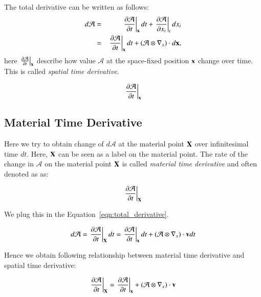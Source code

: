 The total derivative can be written as follows:
%
\begin{eqnarray}
d{\mathcal{A}}
&=&\left.\frac{\partial\mathcal{A}}{\partial{t}}\right|_{\mathbf{x}}dt+\left.\frac{\partial\mathcal{A}}{\partial{x_i}}\right|_{t}dx_i\\
\label{eqn:total_derivative}
&=&\left.\frac{\partial\mathcal{A}}{\partial{t}}\right|_{\mathbf{x}}dt+(\mathcal{A} \otimes \nabla_x) \cdot d{\mathbf{x}},
\end{eqnarray}
%
here $\left.\frac{\partial\mathcal{A}}{\partial{t}}\right|_{\mathbf{x}}$ describe how value $\mathcal{A}$ at the space-fixed position $\mathbf{x}$ change over time. This is called \emph{spatial time derivative}.

\begin{tcolorbox}[title=spatial time derivative]
\begin{equation}
\left.\frac{\partial\mathcal{A}}{\partial{t}}\right|_{\mathbf{x}}
\end{equation}
\end{tcolorbox}



\subsection{Material Time Derivative}


Here we try to obtain change of $d\mathcal{A}$ at the material point $\mathbf{X}$ over infinitesimal time $dt$.
%
Here, $\mathbf{X}$ can be seen as a label on the material point. 
%
The rate of the change in $\mathcal{A}$ on the material point $\mathbf{X}$ is called \emph{material time derivative} and often denoted as as:
%
\begin{tcolorbox}[title=material time derivative]
\begin{equation}
\left.\frac{\partial\mathcal{A}}{\partial{t}}\right|_{\mathbf{X}}
\end{equation}
\end{tcolorbox}
%




%
We plug this in the Equation~\eqref{eqn:total_derivative}.

\begin{equation}
d{\mathcal{A}}=\left.\frac{\partial\mathcal{A}}{\partial{t}}\right|_{\mathbf{X}}dt=\left.\frac{\partial\mathcal{A}}{\partial{t}}\right|_{\mathbf{x}}dt+( \mathcal{A} \otimes \nabla_x ) \cdot {\mathbf{v}}dt
\end{equation}

Hence we obtain following relationship between material time derivative and spatial time derivative:
%
\begin{tcolorbox}[title=relationship between material time derivative and spatial time derivative]
\begin{equation}
\left.\frac{\partial\mathcal{A}}{\partial{t}}\right|_{\mathbf{X}}  =  \left.\frac{\partial\mathcal{A}}{\partial{t}}\right|_{\mathbf{x}}+{( {\mathcal{A}} \otimes \nabla_x ) \cdot \mathbf{v}}
\end{equation}
\end{tcolorbox}




